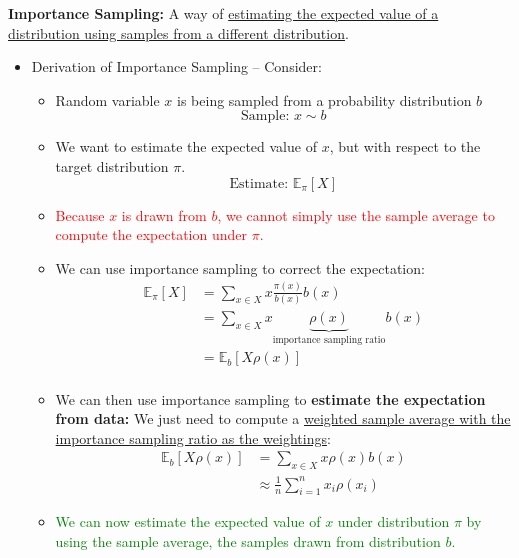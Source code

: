 \documentclass[12pt, a4paper]{article}
\begin{document}
\textbf{Importance Sampling:} A way of \uline{estimating the expected value of a distribution using samples from a different distribution}.
\begin{itemize}
  \item Derivation of Importance Sampling – Consider:
  \begin{itemize}
    \item Random variable $x$ is being sampled from a probability distribution $b$
    $$
    \text{Sample: } x \sim b
    $$
    \item We want to estimate the expected value of $x$, but with respect to the target distribution $\pi$.
    $$
    \text{Estimate: } \mathbb{E}_\pi[X]
    $$

    \item \textcolor{Red}{Because $x$ is drawn from $b$, we cannot simply use the sample average to compute the expectation under $\pi$.}

    \item We can use importance sampling to correct the expectation:
      \begin{align*}
      \mathbb{E}_\pi[X] &=
      \sum_{x \in X} x \frac{\pi(x)}{b(x)} b(x) \\
      &= \sum_{x \in X} x \underbrace{\rho(x)}_\text{importance sampling ratio}b(x) \\
      &= \mathbb{E}_b [X\rho(x)] \\
      \end{align*}
    \item We can then use importance sampling to \textbf{estimate the expectation from data:} We just need to compute a \uline{weighted sample average with the importance sampling ratio as the weightings}:
      \begin{align*}
      \mathbb{E}_b [X\rho(x)] &=
      \sum_{x \in X} x \rho(x) b(x) \\
      &\approx \frac{1}{n} \sum_{i=1}^n x_i \rho(x_i)
      \end{align*}
    \item \textcolor{Green}{We can now estimate the expected value of $x$ under distribution $\pi$ by using the sample average, the samples drawn from distribution $b$.}


\end{itemize}
\end{itemize}
\end{document}
